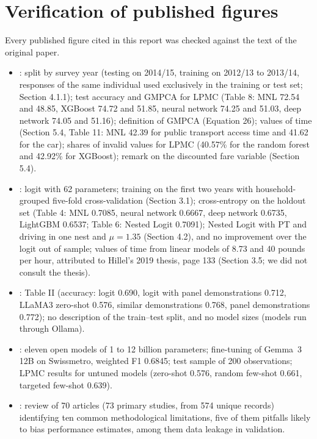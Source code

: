 \documentclass[11pt,a4paper]{article}
\begin{document}
\section{Verification of published figures}
\label{app:lit}
Every published figure cited in this report was checked against the text of the original paper.
\begin{itemize}
\item \citet{martinbaos2023}: split by survey year (testing on 2014/15, training on 2012/13 to 2013/14, responses of the same individual used exclusively in the training or test set; Section 4.1.1); test accuracy and GMPCA for LPMC (Table 8: MNL 72.54 and 48.85, XGBoost 74.72 and 51.85, neural network 74.25 and 51.03, deep network 74.05 and 51.16); definition of GMPCA (Equation 26); values of time (Section 5.4, Table 11: MNL 42.39 for public transport access time and 41.62 for the car); shares of invalid values for LPMC (40.57\% for the random forest and 42.92\% for XGBoost); remark on the discounted fare variable (Section 5.4).
\item \citet{salvade2024}: logit with 62 parameters; training on the first two years with household-grouped five-fold cross-validation (Section 3.1); cross-entropy on the holdout set (Table 4: MNL 0.7085, neural network 0.6667, deep network 0.6735, LightGBM 0.6537; Table 6: Nested Logit 0.7091); Nested Logit with PT and driving in one nest and $\mu=1.35$ (Section 4.2), and no improvement over the logit out of sample; values of time from linear models of 8.73 and 40 pounds per hour, attributed to Hillel's 2019 thesis, page 133 (Section 3.5; we did not consult the thesis).
\item \citet{zhai2024}: Table II (accuracy: logit 0.690, logit with panel demonstrations 0.712, LLaMA3 zero-shot 0.576, similar demonstrations 0.768, panel demonstrations 0.772); no description of the train--test split, and no model sizes (models run through Ollama).
\item \citet{alsaleh2025}: eleven open models of 1 to 12 billion parameters; fine-tuning of Gemma~3 12B on Swissmetro, weighted F1 0.6845; test sample of 200 observations; LPMC results for untuned models (zero-shot 0.576, random few-shot 0.661, targeted few-shot 0.639).
\item \citet{hillel2021}: review of 70 articles (73 primary studies, from 574 unique records) identifying ten common methodological limitations, five of them pitfalls likely to bias performance estimates, among them data leakage in validation.
\end{itemize}
\end{document}
